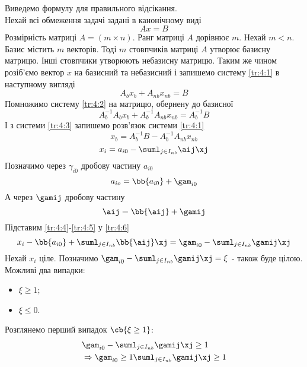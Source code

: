 Виведемо формулу для правильного відсікання. \\
Нехай всі обмеження задачі задані в канонічному виді
\begin{equation}\label{tr:4:1}
Ax = B
\end{equation}
Розмірність матриці $A=(m\times n)$. Ранг матриці $A$ дорівнює $m$. Нехай $m<n$. Базис містить $m$ векторів. Тоді $m$ стовпчиків матриці $A$ утворює базисну матрицю. Інші стовпчики утворюють небазисну матрицю. Таким же чином розіб’ємо вектор $x$ на базисний та небазисний і запишемо систему \eqref{tr:4:1} в наступному вигляді
\begin{equation}\label{tr:4:2}
A_bx_b + A_{nb}x_{nb} = B
\end{equation}
Помножимо систему \eqref{tr:4:2} на матрицю, обернену до базисної
\begin{equation}\label{tr:4:3}
A^{-1}_bA_bx_b + A^{-1}_bA_{nb}x_{nb} = A^{-1}_bB
\end{equation}
І з системи \eqref{tr:4:3} запишемо розв’язок системи \eqref{tr:4:1}
\begin{equation}
x_b = A^{-1}_bB - A^{-1}_bA_{nb}x_{nb}
\end{equation}
\begin{equation}\label{tr:4:6}
x_i = a_{i0} - \suml_{j\in I_{nb}} \aij\xj
\end{equation}
Позначимо через $\gamma_{i0}$ дробову частину $a_{i0}$
\begin{equation}\label{tr:4:4}
a_{io} = \bb{a_{i0}}+\gam_{i0}
\end{equation}
А через $\gamij$ дробову частину \aij
\begin{equation}\label{tr:4:5}
\aij = \bb{\aij} + \gamij
\end{equation}
Підставим \eqref{tr:4:4}-\eqref{tr:4:5} у \eqref{tr:4:6}
\begin{equation}
x_i -\bb{a_{i0}}+\suml_{j\in I_{nb}} \bb{\aij}\xj = \gam_{i0} - \suml_{j\in I_{nb}} \gamij\xj
\end{equation}
Нехай $x_i$ ціле. Позначимо $\gam_{i0} - \suml_{j\in I_{nb}} \gamij\xj = \xi$ - також буде цілою.\\
Можливі два випадки:
\begin{itemize}
\item $\xi\geq 1$;
\item $\xi\leq 0$.
\end{itemize}
Розглянемо перший випадок $\cb{\xi\geq 1}$:
\begin{eqnarray}
&\gam_{i0} - \suml_{j\in I_{nb}} \gamij\xj \geq 1\\
&\Rightarrow \gam_{i0} \geq 1 \suml_{j\in I_{nb}} \gamij\xj \geq 1
\end{eqnarray}
